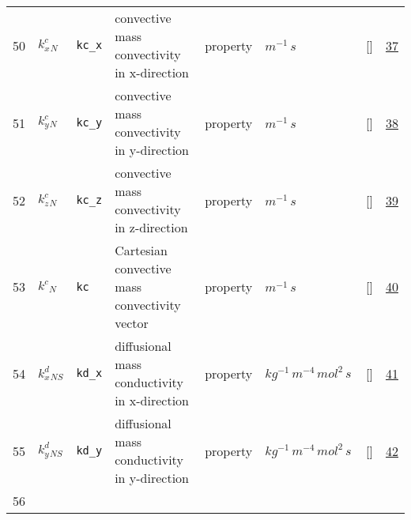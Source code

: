 \begin{longtable}{|p{1cm}|p{3cm}|p{3cm}|p{7cm}|p{3.0cm}|p{3cm}|p{2cm}|p{1cm}|}
    50
             & \hypertarget{"v:50"}{ $ {k^c_x}{_{N}} $}
             & \verb|kc_x|
             & convective mass convectivity in x-direction
             & \begin{lay}property \end{lay}
             & $ m^{-1} \,s \, $
             & []
             & \hyperlink{"e:37"}{ 37 }
                 \\
    51
             & \hypertarget{"v:51"}{ $ {k^c_y}{_{N}} $}
             & \verb|kc_y|
             & convective mass convectivity in y-direction
             & \begin{lay}property \end{lay}
             & $ m^{-1} \,s \, $
             & []
             & \hyperlink{"e:38"}{ 38 }
                 \\
    52
             & \hypertarget{"v:52"}{ $ {k^c_z}{_{N}} $}
             & \verb|kc_z|
             & convective mass convectivity in z-direction
             & \begin{lay}property \end{lay}
             & $ m^{-1} \,s \, $
             & []
             & \hyperlink{"e:39"}{ 39 }
                 \\
    53
             & \hypertarget{"v:53"}{ $ {k^c}{_{N}} $}
             & \verb|kc|
             & Cartesian convective mass convectivity vector
             & \begin{lay}property \end{lay}
             & $ m^{-1} \,s \, $
             & []
             & \hyperlink{"e:40"}{ 40 }
                 \\
    54
             & \hypertarget{"v:54"}{ $ {k^d_x}{_{{N S}}} $}
             & \verb|kd_x|
             & diffusional mass conductivity in x-direction
             & \begin{lay}property \end{lay}
             & $ kg^{-1} \,m^{-4} \,mol^{2} \,s \, $
             & []
             & \hyperlink{"e:41"}{ 41 }
                 \\
    55
             & \hypertarget{"v:55"}{ $ {k^d_y}{_{{N S}}} $}
             & \verb|kd_y|
             & diffusional mass conductivity in y-direction
             & \begin{lay}property \end{lay}
             & $ kg^{-1} \,m^{-4} \,mol^{2} \,s \, $
             & []
             & \hyperlink{"e:42"}{ 42 }
                 \\
    56

\end{longtable}
